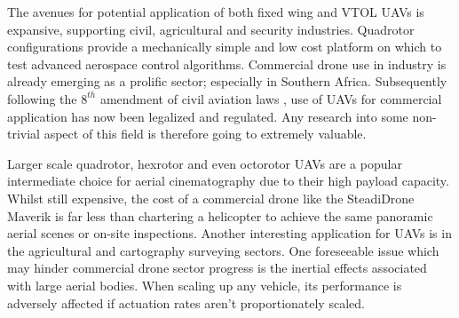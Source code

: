 \par
The avenues for potential application of both fixed wing and VTOL UAVs is expansive, supporting civil\cite{civilquadcopter}, agricultural\cite{agriculturequadcopter} and security\cite{videosurveillancequadcopter} industries. Quadrotor configurations provide a mechanically simple and low cost platform on which to test advanced aerospace control algorithms. Commercial drone use in industry is already emerging as a prolific sector; especially in Southern Africa. Subsequently following the $8^{th}$ amendment of civil aviation laws \cite{dronelaw}, use of UAVs for commercial application has now been legalized and regulated. Any research into some non-trivial aspect of this field is therefore going to extremely valuable. 
\par
Larger scale quadrotor, hexrotor and even octorotor UAVs are a popular intermediate choice for aerial cinematography due to their high payload capacity.  Whilst still expensive, the cost of a commercial drone like the SteadiDrone Maverik \cite{steadidrone} is far less than chartering a helicopter to achieve the same panoramic aerial scenes or on-site inspections. Another interesting application for UAVs is in the agricultural and cartography surveying sectors. One foreseeable issue which may hinder commercial drone sector progress is the inertial effects associated with large aerial bodies. When scaling up any vehicle, its performance is adversely affected if actuation rates aren't proportionately scaled.
